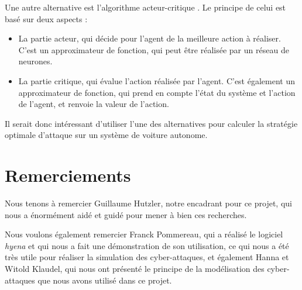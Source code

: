 \documentclass[a4paper]{article}
\begin{document}
    Une autre alternative est l'algorithme acteur-critique \cite{konda_actor-critic_nodate}. Le principe de celui est basé sur deux aspects :
    \begin{itemize}
        \item La partie acteur, qui décide pour l'agent de la meilleure action à réaliser. C'est un approximateur de fonction, qui peut être réalisée par un réseau de neurones.
        \item La partie critique, qui évalue l'action réalisée par l'agent. C'est également un approximateur de fonction, qui prend en compte l'état du système et l'action de l'agent, et renvoie la valeur de l'action.
    \end{itemize}

    Il serait donc intéressant d'utiliser l'une des alternatives pour calculer la stratégie optimale d'attaque sur un système de voiture autonome.

    \section{Remerciements}

    Nous tenons à remercier Guillaume Hutzler, notre encadrant pour ce projet, qui nous a énormément aidé et guidé pour mener à bien ces recherches.

    Nous voulons également remercier Franck Pommereau, qui a réalisé le logiciel \textit{hyena} et qui nous a fait une démonstration de son utilisation, ce qui nous a été très utile pour réaliser la simulation des cyber-attaques, et également Hanna et Witold Klaudel, qui nous ont présenté le principe de la modélisation des cyber-attaques que nous avons utilisé dans ce projet.

    \newpage

    \tableofcontents

    \newpage

    
    

    \newpage
\end{document}

